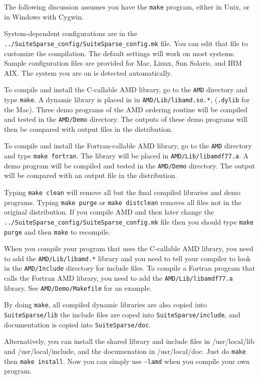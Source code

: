 \documentclass[11pt]{article}
\begin{document}
The following discussion assumes you have the {\tt make} program, either in
Unix, or in Windows with Cygwin.

System-dependent configurations are in the
{\tt ../SuiteSparse\_config/SuiteSparse\_config.mk}
file.  You can edit that file to customize the compilation.  The default
settings will work on most systems.
Sample configuration files are provided
for Mac, Linux, Sun Solaris, and IBM AIX.
The system you are on is detected automatically.

To compile and install the C-callable AMD library,
go to the {\tt AMD} directory and type {\tt make}.
A dynamic library is placed in
in {\tt AMD/Lib/libamd.so.*}, ({\tt *.dylib} for the Mac).
Three demo programs of the AMD ordering routine will be compiled and tested in
the {\tt AMD/Demo} directory.
The outputs of these demo programs will then be compared with output
files in the distribution.

To compile and install the Fortran-callable AMD library,
go to the {\tt AMD} directory and type {\tt make fortran}.
The library will be placed in {\tt AMD/Lib/libamdf77.a}.
A demo program will be compiled and tested in the {\tt AMD/Demo} directory.
The output will be compared with an output file in the distribution.

Typing {\tt make clean} will remove all but the final compiled libraries
and demo programs.  Typing {\tt make purge} or {\tt make distclean}
removes all files not in the original distribution.
If you compile AMD and then later change the
{\tt ../SuiteSparse\_config/SuiteSparse\_config.mk} file
then you should type {\tt make purge} and then {\tt make} to recompile.

When you compile your program that uses the C-callable AMD library,
you need to add the {\tt AMD/Lib/libamd.*} library
and you need to tell your compiler to look in the
{\tt AMD/Include} directory for include
files.   To compile a Fortran program that calls the Fortran AMD library,
you need to add the {\tt AMD/Lib/libamdf77.a} library.
See {\tt AMD/Demo/Makefile} for an example.

By doing {\tt make}, all compiled dynamic libraries are also copied into {\tt
SuiteSparse/lib} the include files are coped into {\tt SuiteSparse/include},
and documentation is copied into {\tt SuiteSparse/doc}.

Alternatively, you can install the shared library
and include files in /usr/local/lib and /usr/local/include, and
the documenation in /usr/local/doc.
Just do {\tt make} then {\tt make install}.
Now you can simply use {\tt -lamd} when you compile your own program.
\end{document}
